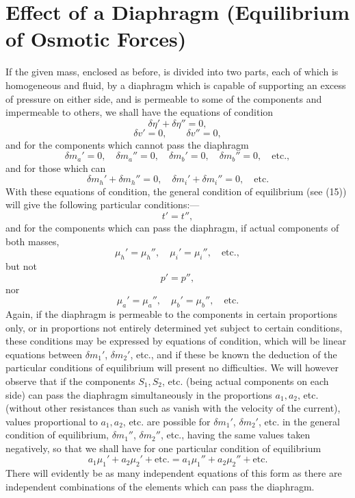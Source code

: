\documentclass[11pt]{article}
\begin{document}
\section*{Effect of a Diaphragm (Equilibrium of Osmotic Forces)}

If the given mass, enclosed as before, is divided into two parts, each of which is homogeneous and fluid, by a diaphragm which is capable of supporting an excess of pressure on either side, and is permeable to some of the components and impermeable to others, we shall have the equations of condition
\begin{equation}
\delta\eta'+\delta\eta''=0,
\end{equation}
\begin{equation}
\delta v'=0,\qquad \delta v''=0,
\end{equation}
and for the components which cannot pass the diaphragm
\begin{equation}
\delta m_a'=0,\quad \delta m_a''=0,\quad
\delta m_b'=0,\quad \delta m_b''=0,\quad \text{etc.},
\end{equation}
and for those which can
\begin{equation}
\delta m_h'+\delta m_h''=0,
\quad \delta m_i'+\delta m_i''=0,
\quad \text{etc.}
\end{equation}
With these equations of condition, the general condition of equilibrium (see (15)) will give the following particular conditions:---
\begin{equation}
t'=t'',
\end{equation}
and for the components which can pass the diaphragm, if actual components of both masses,
\begin{equation}
\mu_h'=\mu_h'',\quad \mu_i'=\mu_i'',\quad \text{etc.},
\end{equation}
but not
\[
p'=p'',
\]
nor
\[
\mu_a'=\mu_a'',\quad \mu_b'=\mu_b'',\quad \text{etc.}
\]
Again, if the diaphragm is permeable to the components in certain proportions only, or in proportions not entirely determined yet subject to certain conditions, these conditions may be expressed by equations of condition, which will be linear equations between \(\delta m_1'\), \(\delta m_2'\), etc., and if these be known the deduction of the particular conditions of equilibrium will present no difficulties. We will however observe that if the components \(S_1,S_2\), etc. (being actual components on each side) can pass the diaphragm simultaneously in the proportions \(a_1,a_2\), etc. (without other resistances than such as vanish with the velocity of the current), values proportional to \(a_1,a_2\), etc. are possible for \(\delta m_1'\), \(\delta m_2'\), etc. in the general condition of equilibrium, \(\delta m_1''\), \(\delta m_2''\), etc., having the same values taken negatively, so that we shall have for one particular condition of equilibrium
\begin{equation}
a_1\mu_1'+a_2\mu_2'+\text{etc.}=a_1\mu_1''+a_2\mu_2''+\text{etc.}
\end{equation}
There will evidently be as many independent equations of this form as there are independent combinations of the elements which can pass the diaphragm.
\end{document}
